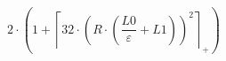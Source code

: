 \[2 \cdot \left(1 + \left\lceil 32 \cdot \left(R \cdot \left(\frac{L0}{\varepsilon} + L1\right)\right)^{2} \right\rceil_{+}\right)\]
